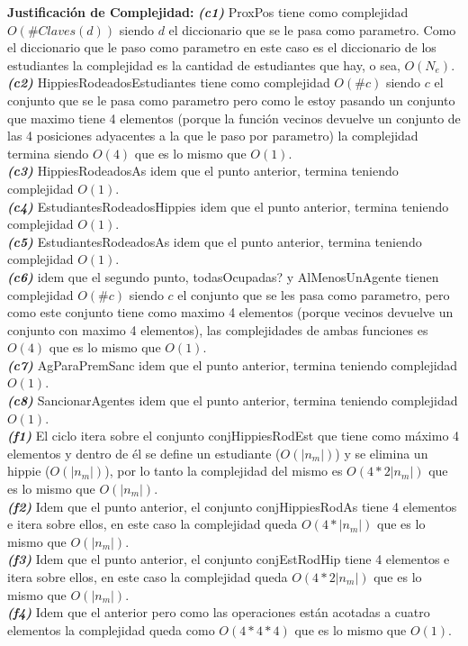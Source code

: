 \textbf{Justificación de Complejidad:} \textit{\textbf{(c1)}} ProxPos tiene como complejidad $O(\#Claves(d))$ siendo $d$ el diccionario que se le pasa como parametro. Como el diccionario que le paso como parametro en este caso es el diccionario de los estudiantes la complejidad es la cantidad de estudiantes que hay, o sea, $O(N_e)$. \\
\textit{\textbf{(c2)}} HippiesRodeadosEstudiantes tiene como complejidad $O(\#c)$ siendo $c$ el conjunto que se le pasa como parametro pero como le estoy pasando un conjunto que maximo tiene 4 elementos (porque la función vecinos devuelve un conjunto de las 4 posiciones adyacentes a la que le paso por parametro) la complejidad termina siendo $O(4)$ que es lo mismo que $O(1)$. \\
\textit{\textbf{(c3)}} HippiesRodeadosAs idem que el punto anterior, termina teniendo complejidad $O(1)$. \\
\textit{\textbf{(c4)}} EstudiantesRodeadosHippies idem que el punto anterior, termina teniendo complejidad $O(1)$. \\
\textit{\textbf{(c5)}} EstudiantesRodeadosAs idem que el punto anterior, termina teniendo complejidad $O(1)$. \\
\textit{\textbf{(c6)}} idem que el segundo punto, todasOcupadas? y AlMenosUnAgente tienen complejidad $O(\#c)$ siendo $c$ el conjunto que se les pasa como parametro, pero como este conjunto tiene como maximo 4 elementos (porque vecinos devuelve un conjunto con maximo 4 elementos), las complejidades de ambas funciones es $O(4)$ que es lo mismo que $O(1)$. \\
\textit{\textbf{(c7)}} AgParaPremSanc idem que el punto anterior, termina teniendo complejidad $O(1)$. \\
\textit{\textbf{(c8)}} SancionarAgentes idem que el punto anterior, termina teniendo complejidad $O(1)$. \\
\textit{\textbf{(f1)}} El ciclo itera sobre el conjunto conjHippiesRodEst que tiene como máximo 4 elementos y dentro de él se define un estudiante ($O(|n_m|)$) y se elimina un hippie ($O(|n_m|)$), por lo tanto la complejidad del mismo es $O(4*2|n_m|)$ que es lo mismo que $O(|n_m|)$. \\
\textit{\textbf{(f2)}} Idem que el punto anterior, el conjunto conjHippiesRodAs tiene 4 elementos e itera sobre ellos, en este caso la complejidad queda $O(4*|n_m|)$ que es lo mismo que  $O(|n_m|)$. \\
\textit{\textbf{(f3)}} Idem que el punto anterior, el conjunto conjEstRodHip tiene 4 elementos e itera sobre ellos, en este caso la complejidad queda $O(4*2|n_m|)$ que es lo mismo que  $O(|n_m|)$. \\
\textit{\textbf{(f4)}} Idem que el anterior pero como las operaciones están acotadas a cuatro elementos la complejidad queda como $O(4*4*4)$ que es lo mismo que $O(1)$.

